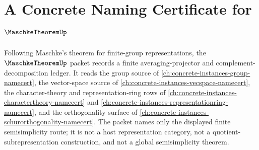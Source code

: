 \chapter{A Concrete Naming Certificate for $\MaschkeTheoremUp$}
\label{ch:concrete-instances-maschke-theorem-namecert}

Following Maschke's theorem for finite-group representations, the $\MaschkeTheoremUp$ packet records a finite averaging-projector and complement-decomposition ledger. It reads the group source of \autoref{ch:concrete-instances-group-namecert}, the vector-space source of \autoref{ch:concrete-instances-vecspace-namecert}, the character-theory and representation-ring rows of \autoref{ch:concrete-instances-charactertheory-namecert} and \autoref{ch:concrete-instances-representationring-namecert}, and the orthogonality surface of \autoref{ch:concrete-instances-schurorthogonality-namecert}. The packet names only the displayed finite semisimplicity route; it is not a host representation category, not a quotient-subrepresentation construction, and not a global semisimplicity theorem.

